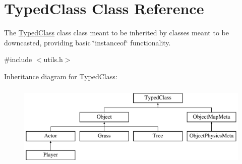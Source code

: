 \hypertarget{classTypedClass}{}\section{Typed\+Class Class Reference}
\label{classTypedClass}


The \hyperlink{classTypedClass}{Typed\+Class} class class meant to be inherited by classes meant to be downcasted, providing basic \char`\"{}instanceof\char`\"{} functionality.  




{\ttfamily \#include $<$utils.\+h$>$}

Inheritance diagram for Typed\+Class\+:\begin{figure}[H]
\begin{center}
\leavevmode
\includegraphics[height=4.000000cm]{classTypedClass}
\end{center}
\end{figure}
